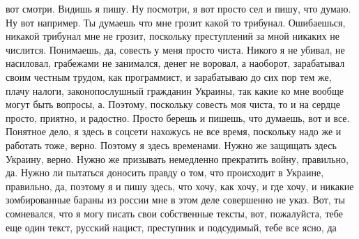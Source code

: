  
 
 
 
 

вот смотри. Видишь я пишу. Ну посмотри, я вот просто сел и пишу, что думаю. Ну
вот например. Ты думаешь что мне грозит какой то трибунал. Ошибаешься, никакой
трибунал мне не грозит, поскольку преступлений за мной никаких не числится.
Понимаешь, да, совесть у меня просто чиста. Никого я не убивал, не насиловал,
грабежами не занимался, денег не воровал, а наоборот, зарабатывал своим честным
трудом, как программист, и зарабатываю до сих пор тем же, плачу налоги,
законопослушный гражданин Украины, так какие ко мне вообще могут быть вопросы,
а. Поэтому, поскольку совесть моя чиста, то и на сердце просто, приятно, и
радостно. Просто берешь и пишешь, что думаешь, вот и все. Понятное дело, я
здесь в соцсети нахожусь не все время, поскольку надо же и работать тоже,
верно. Поэтому я здесь временами. Нужно же защищать здесь Украину, верно. Нужно
же призывать немедленно прекратить войну, правильно, да. Нужно ли пытаться
доносить правду о том, что происходит в Украине, правильно, да, поэтому я и
пишу здесь, что хочу, как хочу, и где хочу, и никакие зомбированные бараны из
россии мне в этом деле совершенно не указ. Вот, ты сомневался, что я могу
писать свои собственные тексты, вот, пожалуйста, тебе еще один текст, русский
нацист, преступник и подсудимый, тебе все ясно, да
